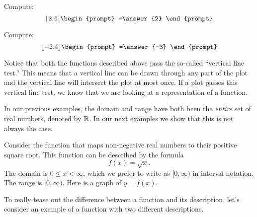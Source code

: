 \documentclass{ximera}
\begin{document}
\begin{question}
  Compute:
  \[
  \lfloor 2.4 \rfloor
  \begin{prompt}
    =\answer{2}
  \end{prompt}
  \]
  \begin{question}
  Compute:
  \[
  \lfloor -2.4 \rfloor
  \begin{prompt}
    =\answer{-3}
  \end{prompt}
  \]
\end{question}
\end{question}


Notice that both the functions described above pass the so-called
``vertical line test.''  This means that a vertical line can be drawn
through any part of the plot and the vertical line will intersect
the plot at most once.  If a plot passes this vertical line test, we know that
we are looking at a representation of a function.

In our previous examples, the domain and range have both been the
\textit{entire} set of real numbers, denoted by $\mathbb R$. In our next
examples we show that this is not always the case.

\begin{example}
Consider the function that maps non-negative real numbers to their
positive square root. This function can be described by the
formula
\[
f(x) = \sqrt{x}.
\]
The domain is $0\le x<\infty$, which we prefer to write as
$[0,\infty)$ in interval notation. The range is $[0,\infty)$.  Here is
    a graph of $y=f(x)$.
  
\begin{image}
\end{image}
\end{example}

To really tease out the difference between a function and its
description, let's consider an example of a function with two
different descriptions.
\end{document}
